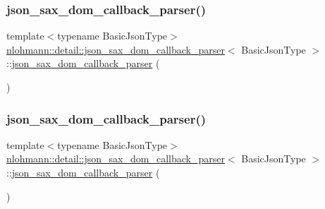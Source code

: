 \subsubsection{\texorpdfstring{json\_sax\_dom\_callback\_parser()}{json\_sax\_dom\_callback\_parser()}\hspace{0.1cm}{\footnotesize\ttfamily [2/3]}}
{\footnotesize\ttfamily template$<$typename Basic\+Json\+Type$>$ \\
\mbox{\hyperlink{classnlohmann_1_1detail_1_1json__sax__dom__callback__parser}{nlohmann\+::detail\+::json\+\_\+sax\+\_\+dom\+\_\+callback\+\_\+parser}}$<$ Basic\+Json\+Type $>$\+::\mbox{\hyperlink{classnlohmann_1_1detail_1_1json__sax__dom__callback__parser}{json\+\_\+sax\+\_\+dom\+\_\+callback\+\_\+parser}} (\begin{DoxyParamCaption}\item[{const \mbox{\hyperlink{classnlohmann_1_1detail_1_1json__sax__dom__callback__parser}{json\+\_\+sax\+\_\+dom\+\_\+callback\+\_\+parser}}$<$ Basic\+Json\+Type $>$ \&}]{ }\end{DoxyParamCaption})\hspace{0.3cm}{\ttfamily [delete]}}

\mbox{\label{classnlohmann_1_1detail_1_1json__sax__dom__callback__parser_af1ce6c746e3ebadb7994170725fcdbb5}} 
\subsubsection{\texorpdfstring{json\_sax\_dom\_callback\_parser()}{json\_sax\_dom\_callback\_parser()}\hspace{0.1cm}{\footnotesize\ttfamily [3/3]}}
{\footnotesize\ttfamily template$<$typename Basic\+Json\+Type$>$ \\
\mbox{\hyperlink{classnlohmann_1_1detail_1_1json__sax__dom__callback__parser}{nlohmann\+::detail\+::json\+\_\+sax\+\_\+dom\+\_\+callback\+\_\+parser}}$<$ Basic\+Json\+Type $>$\+::\mbox{\hyperlink{classnlohmann_1_1detail_1_1json__sax__dom__callback__parser}{json\+\_\+sax\+\_\+dom\+\_\+callback\+\_\+parser}} (\begin{DoxyParamCaption}\item[{\mbox{\hyperlink{classnlohmann_1_1detail_1_1json__sax__dom__callback__parser}{json\+\_\+sax\+\_\+dom\+\_\+callback\+\_\+parser}}$<$ Basic\+Json\+Type $>$ \&\&}]{ }\end{DoxyParamCaption})\hspace{0.3cm}{\ttfamily [default]}}

